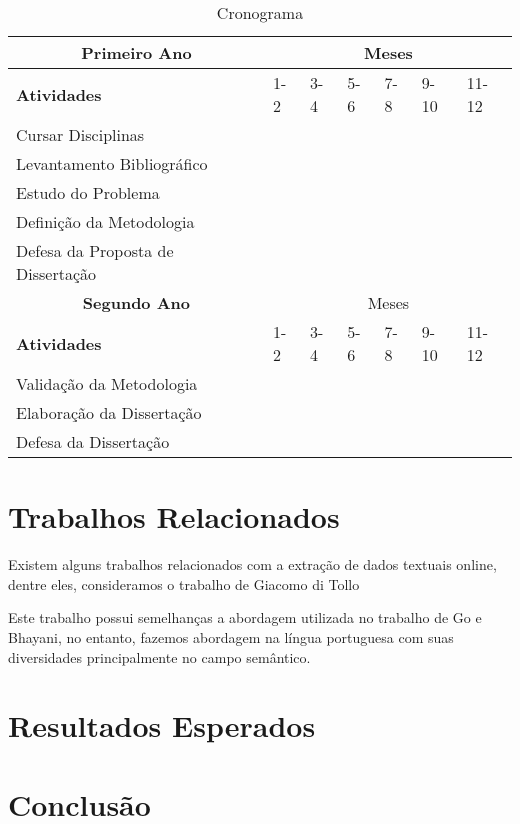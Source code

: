 \documentclass[12pt]{article}
\begin{document}
\begin{longtable}[c]{|l|l|l|l|l|l|l|}
\caption{Cronograma} \label{my-label}\\ \hline
\endfirsthead
\endhead
\multicolumn{1}{|c|}{\textbf{Primeiro Ano}} & \multicolumn{6}{c|}{\cellcolor[HTML]{ECF4FF}Meses} \\ \hline
\rowcolor[HTML]{ECF4FF} 
\textbf{Atividades} & 1-2 & 3-4 & 5-6 & 7-8 & 9-10 & 11-12 \\ \hline
Cursar Disciplinas & \cellcolor[HTML]{C0C0C0} & \cellcolor[HTML]{C0C0C0} & \cellcolor[HTML]{C0C0C0} & \cellcolor[HTML]{C0C0C0} & \cellcolor[HTML]{C0C0C0} & \cellcolor[HTML]{C0C0C0} \\ \hline
Levantamento Bibliográfico & \cellcolor[HTML]{C0C0C0} & & & & & \\ \hline
Estudo do Problema & & \cellcolor[HTML]{C0C0C0} & \cellcolor[HTML]{C0C0C0} & & & \\ \hline
Definição da Metodologia & & & & \cellcolor[HTML]{C0C0C0} & \cellcolor[HTML]{C0C0C0} & \\ \hline
Defesa da Proposta de Dissertação & & & & & \cellcolor[HTML]{C0C0C0} \\ \hline
\multicolumn{1}{|c|}{\textbf{Segundo Ano}}  & \multicolumn{6}{c|}{\cellcolor[HTML]{ECF4FF}Meses} \\ \hline \rowcolor[HTML]{ECF4FF} 
\textbf{Atividades} & 1-2 & 3-4 & 5-6 & 7-8 & 9-10 & 11-12 \\ \hline
Validação da Metodologia & \cellcolor[HTML]{C0C0C0} & \cellcolor[HTML]{C0C0C0} & \cellcolor[HTML]{C0C0C0} & & & \\ \hline
Elaboração da Dissertação & & & \cellcolor[HTML]{C0C0C0} & \cellcolor[HTML]{C0C0C0} & \cellcolor[HTML]{C0C0C0} & \\ \hline
Defesa da Dissertação & & & & & & \cellcolor[HTML]{C0C0C0} \\ \hline
\end{longtable}

\section{Trabalhos Relacionados} \label{sec:trab-rel}

Existem alguns trabalhos relacionados com a extração de dados textuais online, dentre eles, consideramos o trabalho de Giacomo di Tollo

Este trabalho possui semelhanças a abordagem utilizada no trabalho de Go e Bhayani, no entanto, fazemos abordagem na língua portuguesa com suas diversidades principalmente no campo semântico.

\section{Resultados Esperados} \label{sec:Result}

\section{Conclusão} \label{sec:concl}

\newpage


\end{document}
